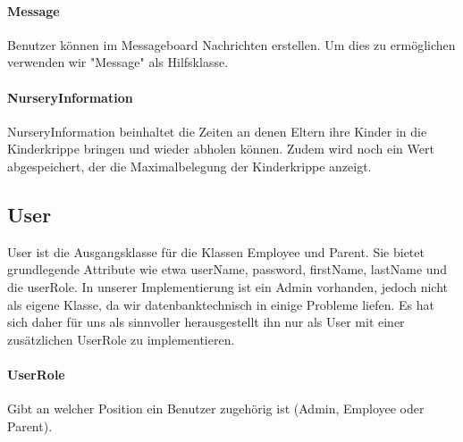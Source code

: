 \paragraph{Message}
	Benutzer können im Messageboard Nachrichten erstellen. Um dies zu ermöglichen verwenden wir "Message" als Hilfsklasse. 
\paragraph{NurseryInformation}
	NurseryInformation beinhaltet die Zeiten an denen Eltern ihre Kinder in die Kinderkrippe bringen und wieder abholen können. Zudem wird noch ein Wert abgespeichert, der die Maximalbelegung der Kinderkrippe anzeigt. 
	
\subsection{User}
User ist die Ausgangsklasse für die Klassen Employee und Parent. Sie bietet grundlegende Attribute wie etwa userName, password, firstName, lastName und die userRole. 
In unserer Implementierung ist ein Admin vorhanden, jedoch nicht als eigene Klasse, da wir datenbanktechnisch in einige Probleme liefen. Es hat sich daher für uns als sinnvoller herausgestellt ihn nur als User mit einer zusätzlichen UserRole zu implementieren. 
\paragraph{UserRole}
Gibt an welcher Position ein Benutzer zugehörig ist (Admin, Employee oder Parent). 

